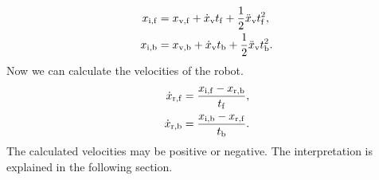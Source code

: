         \begin{align}
            x_{\rm{i,f}} &= x_{\rm{v,f}} + \dot{x}_{\rm{v}}t_{\rm{f}} + \frac{1}{2}\ddot{x}_{\rm{v}}t_{\rm{f}}^2,\\
            x_{\rm{i,b}} &= x_{\rm{v,b}} + \dot{x}_{\rm{v}}t_{\rm{b}} + \frac{1}{2}\ddot{x}_{\rm{v}}t_{\rm{b}}^2.
        \end{align}
        Now we can calculate the velocities of the robot.
        \begin{align}
            \dot{x}_{\rm{r,f}} &= \frac{x_{\rm{i,f}}-x_{\rm{r,b}}}{t_{\rm{f}}},\\
            \dot{x}_{\rm{r,b}} &= \frac{x_{\rm{i,b}}-x_{\rm{r,f}}}{t_{\rm{b}}}.
        \end{align}
        The calculated velocities may be positive or negative. The interpretation is explained in the following section.\\\\
